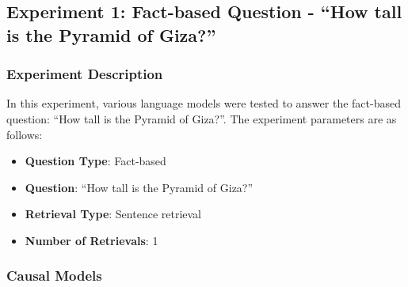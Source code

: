 \documentclass[11pt]{wseas}
\begin{document}
\subsection{Experiment 1: Fact-based Question - ``How tall is the
Pyramid of
Giza?''}\label{experiment-1-fact-based-question---how-tall-is-the-pyramid-of-giza}

\subsubsection{Experiment Description}\label{experiment-description}

In this experiment, various language models were tested to answer the
fact-based question: ``How tall is the Pyramid of Giza?''. The
experiment parameters are as follows:

\begin{itemize}
\tightlist
\item
  \textbf{Question Type}: Fact-based
\item
  \textbf{Question}: ``How tall is the Pyramid of Giza?''
\item
  \textbf{Retrieval Type}: Sentence retrieval
\item
  \textbf{Number of Retrievals}: 1
\end{itemize}

\subsubsection{Causal Models}\label{causal-models}
\end{document}
